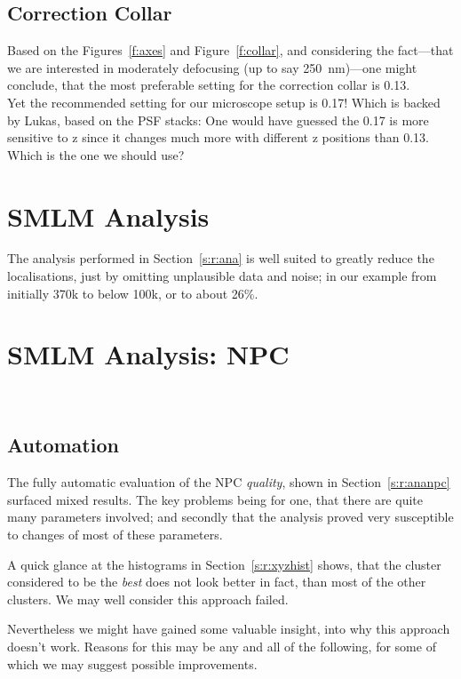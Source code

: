 \documentclass[11pt, a4paper, oneside, twocolumn]{report}
\newcommand{\e}{\emph}
\begin{document}
\subsection{Correction Collar}

Based on the Figures~\ref{f:axes} and Figure~\ref{f:collar}, and
considering the fact---that we are interested in moderately defocusing
(up to say 250~nm)---one might conclude, that the most preferable
setting for the correction collar is 0.13.\\

Yet the recommended setting for our microscope setup is 0.17! Which is
backed by Lukas, based on the PSF stacks: One would have guessed the
0.17 is more sensitive to z since it changes much more with different
z positions than 0.13.\\

Which is the one we should use?\\


\section{SMLM Analysis}

The analysis performed in Section~\ref{s:r:ana} is well suited to
greatly reduce the localisations, just by omitting unplausible data
and noise; in our example from initially 370k to below 100k, or to
about 26\%.


\section{SMLM Analysis: NPC}~\label{s:d:ananpc}

\subsection{Automation}
  
The fully automatic evaluation of the NPC \e{quality}, shown in
Section~\ref{s:r:ananpc} surfaced mixed results. The key problems
being for one, that there are quite many parameters involved; and
secondly that the analysis proved very susceptible to changes of most
of these parameters.

A quick glance at the histograms in Section~\ref{s:r:xyzhist} shows,
that the cluster considered to be the \e{best} does not look better in
fact, than most of the other clusters. We may well consider this
approach failed.

Nevertheless we might have gained some valuable insight, into why this
approach doesn't work. Reasons for this may be any and all of the
following, for some of which we may suggest possible improvements.
\end{document}
